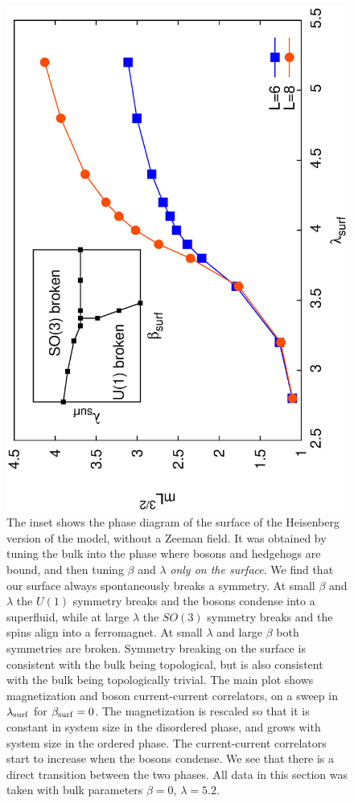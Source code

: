 \documentclass[prb,twocolumn]{revtex4-1}
\begin{document}
\begin{figure}
\includegraphics[angle=-90,width=0.9\linewidth]{figures/heissurf.eps}
\caption{The inset shows the phase diagram of the surface of the Heisenberg version of the model, without a Zeeman field. It was obtained by tuning the bulk into the phase where bosons and hedgehogs are bound, and then tuning $\beta$ and $\lambda$ {\em only on the surface}.  We find that our surface always spontaneously breaks  a symmetry. At small $\beta$ and $\lambda$ the $U(1)$ symmetry breaks and the bosons condense into a superfluid, while at large $\lambda$ the $SO(3)$ symmetry breaks and the spins align into a ferromagnet. At small $\lambda$ and large $\beta$ both symmetries are broken. Symmetry breaking on the surface is consistent with the bulk being topological, but is also consistent with the bulk being topologically trivial. The main plot shows magnetization and boson current-current correlators, on a sweep in $\lambda_{\rm surf}$ for $\beta_{\rm surf}=0$. The magnetization is rescaled so that it is constant in system size in the disordered phase, and grows with system size in the ordered phase. The current-current correlators start to increase when the bosons condense. We see that there is a direct transition between the two phases. All data in this section was taken with bulk parameters $\beta=0$, $\lambda=5.2$.}
\label{heissurf}
\end{figure}
\end{document}
